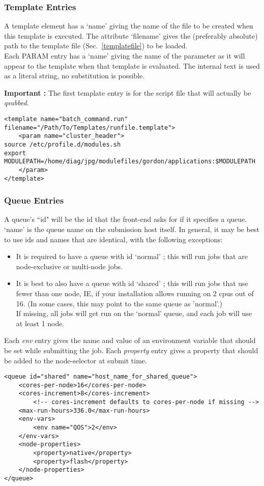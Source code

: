 \subsubsection{Template Entries}
A template element has a `name' giving the name of the file to be created when this template is executed.
The attribute `filename' gives the (preferably absolute) path to the template file (Sec.~\ref{templatefile}) to be loaded.\\
Each PARAM entry has a `name' giving the name of the parameter as it will appear to the template when that template is evaluated. The internal text is used as a literal string, no substitution is possible.

{\bf Important :} The first template entry is for the script file that will actually be {\it qsubbed}.

\begin{lstlisting}[caption={An example template element}]
<template name="batch_command.run" filename="/Path/To/Templates/runfile.template">
	<param name="cluster_header">
source /etc/profile.d/modules.sh
export MODULEPATH=/home/diag/jpg/modulefiles/gordon/applications:$MODULEPATH
	</param>
</template>
\end{lstlisting}

\subsubsection{Queue Entries}
A queue's ``id" will be the id that the front-end asks for if it specifies a queue. `name' is the queue name on the submission host itself.
In general, it may be best to use ids and names that are identical, with the following exceptions:

\begin{itemize}
	\item It is required to have a queue with id `normal' ; this will run jobs that are node-exclusive or multi-node jobs.
	\item It is best to also have a queue with id `shared' ; this will run jobs that use fewer than one node, IE, if your installation allows running on 2 cpus out of 16. (In some cases, this may point to the same queue as 'normal'.) \\ If missing, all jobs will get run on the `normal' queue, and each job will use at least 1 node.
\end{itemize}

Each {\it env } entry gives the name and value of an environment variable that should be set while submitting the job.
Each {\it property } entry gives a property that should be added to the node-selector at submit time.

\begin{lstlisting}[caption={Example Queue entry}]
<queue id="shared" name="host_name_for_shared_queue">
	<cores-per-node>16</cores-per-node>
	<cores-increment>8</cores-increment>
		<!-- cores-increment defaults to cores-per-node if missing -->
	<max-run-hours>336.0</max-run-hours>
	<env-vars>
		<env name="QOS">2</env>
	</env-vars>
	<node-properties>
		<property>native</property>
		<property>flash</property>
	</node-properties>
</queue>
\end{lstlisting}